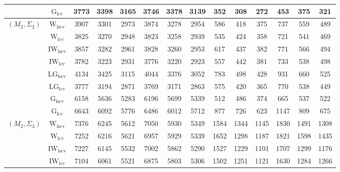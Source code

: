 \begin{table}[!ht]
{\begin{tabular}{@{}cc|ccc|ccc|ccc|ccc@{}}
 & $\mathrm{G}_{\mathrm{lcv}}$ & 3773 & 3398 & 3165 & 3746 & 3378 & 3139 & 352 & 308 & 272 & \cellcolor{black!10}453 & 375 & 321 \\ 
\midrule
$(M_2,\Sigma_2)$ & $\mathrm{W}_{\mathrm{lscv}}$ & 3907 & 3301 & 2973 & 3874 & 3278 & 2954 & 586 & \cellcolor{black!30}418 & 375 & 737 & 559 & 489 \\ 
 & $\mathrm{W}_{\mathrm{lcv}}$ & 3825 & 3270 & 2948 & 3823 & 3258 & 2939 & \cellcolor{black!10}535 & 424 & \cellcolor{black!30}358 & \cellcolor{black!10}721 & 541 & \cellcolor{black!10}469 \\ 
 & $\mathrm{IW}_{\mathrm{lscv}}$ & 3857 & 3282 & 2961 & 3828 & 3260 & 2953 & 617 & 437 & 382 & 771 & 566 & 494 \\ 
 & $\mathrm{IW}_{\mathrm{lcv}}$ & \cellcolor{black!10}3782 & \cellcolor{black!10}3223 & \cellcolor{black!10}2931 & \cellcolor{black!10}3776 & \cellcolor{black!10}3220 & \cellcolor{black!10}2923 & 557 & 442 & 381 & 733 & \cellcolor{black!10}538 & 498 \\ 
 & $\mathrm{LG}_{\mathrm{lscv}}$ & 4134 & 3425 & 3115 & 4044 & 3376 & 3052 & 783 & 498 & 428 & 931 & 660 & 525 \\ 
 & $\mathrm{LG}_{\mathrm{lcv}}$ & \cellcolor{black!30}3777 & \cellcolor{black!30}3194 & \cellcolor{black!30}2871 & \cellcolor{black!30}3769 & \cellcolor{black!30}3171 & \cellcolor{black!30}2863 & 575 & \cellcolor{black!10}420 & \cellcolor{black!10}365 & 770 & 538 & \cellcolor{black!30}449 \\ 
 & $\mathrm{G}_{\mathrm{lscv}}$ & 6158 & 5636 & 5283 & 6196 & 5699 & 5339 & \cellcolor{black!30}512 & 486 & 374 & \cellcolor{black!30}665 & \cellcolor{black!30}537 & 522 \\ 
 & $\mathrm{G}_{\mathrm{lcv}}$ & 6643 & 6092 & 5776 & 6486 & 6012 & 5712 & 877 & 726 & 623 & 1147 & 809 & 675 \\ 
\midrule
$(M_2,\Sigma_3)$ & $\mathrm{W}_{\mathrm{lscv}}$ & 7376 & 6245 & 5612 & 7050 & 5930 & 5349 & 1584 & 1344 & 1145 & 1830 & 1491 & 1308 \\ 
 & $\mathrm{W}_{\mathrm{lcv}}$ & 7252 & 6216 & 5621 & \cellcolor{black!10}6957 & 5929 & 5339 & 1652 & 1298 & 1187 & 1821 & 1598 & 1435 \\ 
 & $\mathrm{IW}_{\mathrm{lscv}}$ & \cellcolor{black!10}7227 & \cellcolor{black!10}6145 & \cellcolor{black!10}5532 & 7002 & \cellcolor{black!10}5862 & \cellcolor{black!30}5290 & 1527 & 1229 & 1101 & 1707 & 1299 & 1176 \\ 
 & $\mathrm{IW}_{\mathrm{lcv}}$ & \cellcolor{black!30}7104 & \cellcolor{black!30}6061 & \cellcolor{black!30}5521 & \cellcolor{black!30}6875 & \cellcolor{black!30}5803 & \cellcolor{black!10}5306 & \cellcolor{black!10}1502 & 1251 & 1121 & 1630 & 1284 & 1266 \\ 

\end{tabular}}
\end{table}
